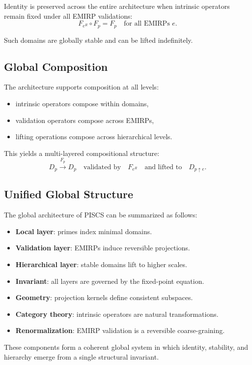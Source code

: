 \documentclass[11pt]{article}
\theoremstyle{definition}
\theoremstyle{plain}
\theoremstyle{remark}
\begin{document}
Identity is preserved across the entire architecture when intrinsic
operators remain fixed under all EMIRP validations:
\[
F_{e^R} \circ F_p = F_p
\quad \text{for all EMIRPs } e.
\]

Such domains are globally stable and can be lifted indefinitely.

\subsection{Global Composition}

The architecture supports composition at all levels:
\begin{itemize}
    \item intrinsic operators compose within domains,
    \item validation operators compose across EMIRPs,
    \item lifting operations compose across hierarchical levels.
\end{itemize}

This yields a multi-layered compositional structure:
\[
D_p \xrightarrow{F_p} D_p
\quad \text{validated by} \quad
F_{e^R}
\quad \text{and lifted to} \quad
D_{p \uparrow e}.
\]

\subsection{Unified Global Structure}

The global architecture of PISCS can be summarized as follows:

\begin{itemize}
    \item \textbf{Local layer}: primes index minimal domains.
    \item \textbf{Validation layer}: EMIRPs induce reversible projections.
    \item \textbf{Hierarchical layer}: stable domains lift to higher scales.
    \item \textbf{Invariant}: all layers are governed by the fixed-point equation.
    \item \textbf{Geometry}: projection kernels define consistent subspaces.
    \item \textbf{Category theory}: intrinsic operators are natural transformations.
    \item \textbf{Renormalization}: EMIRP validation is a reversible coarse-graining.
\end{itemize}

These components form a coherent global system in which identity,
stability, and hierarchy emerge from a single structural invariant.
\end{document}
